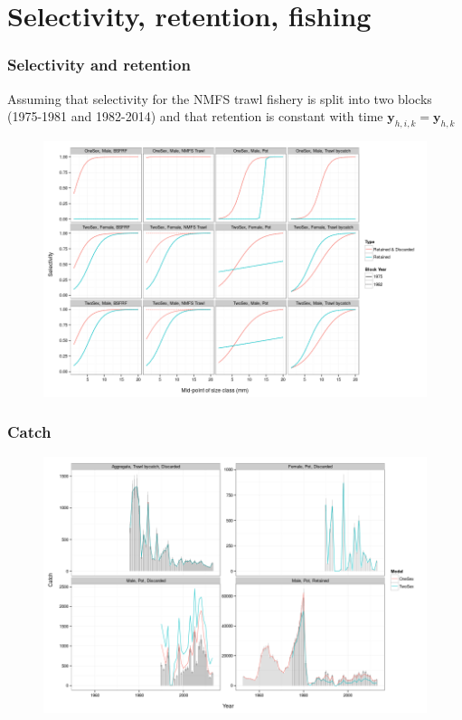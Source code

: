 \documentclass{beamer}
\begin{document}

\section{Selectivity, retention, fishing}


\begin{frame}
\frametitle{Selectivity and retention}
Assuming that selectivity for the NMFS trawl fishery is split into two blocks
(1975-1981 and 1982-2014) and that retention is constant with time
$\boldsymbol{y}_{h,i,k} = \boldsymbol{y}_{h,k}$
\begin{figure}[!htbp]
  \centering
  \includegraphics[width=0.6\linewidth]{figure/selectivity-1.png}
\end{figure}
\end{frame}


\begin{frame}
\frametitle{Catch}
\begin{figure}[!htbp]
  \centering
  \includegraphics[width=0.6\linewidth]{figure/fit_to_catch-1.png}
\end{figure}
\end{frame}
\end{document}
